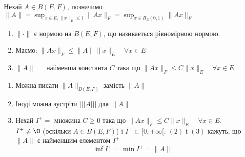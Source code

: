 \begin{theorem}
    Нехай $A \in B(E, F)$, позначимо $\displaystyle \|A\| = \sup_{x \in E, \|x\|_E \le 1} \|Ax\|_F = \sup_{x \in B_E(0, 1)} \|Ax\|_{F}$

    \begin{enumerate}
        \item $\| \cdot \|$ є нормою на $B(E, F)$, що називається рівномірною нормою.
        \item Маємо: $\|Ax\|_F \le \|A\|\|x\|_{E} \quad \forall x \in E$
        \item $\|A\| = $ найменша константа $C$ така що $\|Ax\|_{F} \le C\|x\|_{E} \quad \forall x \in E$
    \end{enumerate}
\end{theorem}
\begin{remark}
    \begin{enumerate}
        \item Можна писати $\|A\|_{B(E, F)}$ замість $\|A\|$ 
        \item Іноді можна зустріти $|||A|||$ для $\|A\|$ 
        \item Нехай $I^+ = $ множина $C \ge 0$ така що $\|Ax\|_{F} \le C\|x\|_{E} \quad \forall x \in E$. \\
            $I^+ \neq \O$ (оскільки $A \in B(E, F)$) і $I^+ \subset [0, +\infty[$. $(2)$ і $(3)$ кажуть, що $\|A\|$ є найменшим елементом $I^+$
             \[
            \inf I^+ = \min I^+ = \|A\|
            \] 
    \end{enumerate}
\end{remark}

